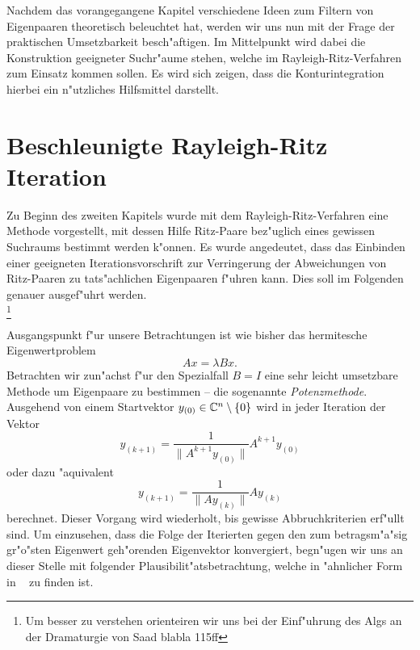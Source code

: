 Nachdem das vorangegangene Kapitel verschiedene Ideen zum Filtern von Eigenpaaren theoretisch beleuchtet hat, werden wir uns nun mit der Frage der praktischen Umsetzbarkeit besch"aftigen.
Im Mittelpunkt wird dabei die Konstruktion geeigneter Suchr"aume stehen, welche im Rayleigh-Ritz-Verfahren zum Einsatz kommen sollen.
Es wird sich zeigen, dass die Konturintegration hierbei ein n"utzliches Hilfsmittel darstellt.


\section{Beschleunigte Rayleigh-Ritz Iteration}\label{chap3:beschrr}

Zu Beginn des zweiten Kapitels wurde mit dem Rayleigh-Ritz-Verfahren eine Methode vorgestellt, mit dessen Hilfe Ritz-Paare bez"uglich eines gewissen Suchraums bestimmt werden k"onnen.
Es wurde angedeutet, dass das Einbinden einer geeigneten Iterationsvorschrift zur Verringerung der Abweichungen von Ritz-Paaren zu tats"achlichen Eigenpaaren f"uhren kann.
Dies soll im Folgenden genauer ausgef"uhrt werden.\\

\footnote{Um besser zu verstehen orienteiren wir uns bei der Einf"uhrung des Algs an der Dramaturgie von Saad blabla 115ff}

Ausgangspunkt f"ur unsere Betrachtungen ist wie bisher das hermitesche Eigenwertproblem
\begin{equation}\label{eq:chap3ewp}
Ax = \lambda Bx.
\end{equation}
Betrachten wir zun"achst f"ur den Spezialfall $B=I$ eine sehr leicht umsetzbare Methode um Eigenpaare zu bestimmen -- die sogenannte \emph{Potenzmethode}.
Ausgehend von einem Startvektor $y_{(0)}\in\mathbb{C}^n \setminus\{0\}$ wird in jeder Iteration der Vektor
\[
y_{(k+1)} = \frac{1}{\|A^{k+1} y_{(0)}\|} A^{k+1}y_{(0)}
\]
oder dazu "aquivalent
\[
y_{(k+1)} = \frac{1}{\|Ay_{(k)}\|} Ay_{(k)}
\]
berechnet. Dieser Vorgang wird wiederholt, bis gewisse Abbruchkriterien erf"ullt sind. Um einzusehen, dass die Folge der Iterierten gegen den zum betragsm"a"sig gr"o"sten Eigenwert geh"orenden Eigenvektor konvergiert, begn"ugen wir uns an dieser Stelle mit folgender Plausibilit"atsbetrachtung, welche in "ahnlicher Form in ~\cite[56]{stewart}
zu finden ist.\\

